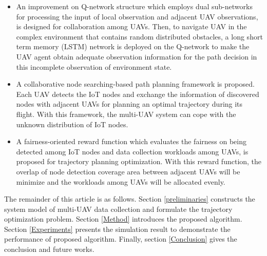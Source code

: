 \documentclass[journal]{IEEEtran}
\begin{document}
\begin{itemize}
  \item An improvement on Q-network structure which employs dual sub-networks for processing the input of local observation and adjacent UAV observations, is designed for collaboration among UAVs. Then, to navigate UAV in the complex environment that contains random distributed obstacles, a long short term memory (LSTM) network is deployed on the Q-network to make the UAV agent obtain adequate observation information for the path decision in this incomplete observation of environment state. 
  \item A collaborative node searching-based path planning framework is proposed. Each UAV detects the IoT nodes and exchange the information of discovered nodes with adjacent UAVs for planning an optimal trajectory during its flight. With this framework, the multi-UAV system can cope with the unknown distribution of IoT nodes. 
  \item A fairness-oriented reward function which evaluates the fairness on being detected among IoT nodes and data collection workloads among UAVs, is proposed for trajectory planning optimization. With this reward function, the overlap of node detection coverage area between adjacent UAVs will be minimize and the workloads among UAVs will be allocated evenly. 
\end{itemize}

The remainder of this article is as follows. Section \ref{preliminaries} constructs the system model of multi-UAV data collection and formulate the trajectory optimization problem. Section \ref{Method} introduces the proposed algorithm. Section \ref{Experiments} presents the simulation result to demonstrate the performance of proposed algorithm. Finally, section \ref{Conclusion} gives the conclusion and future works. 
  
\end{document}
